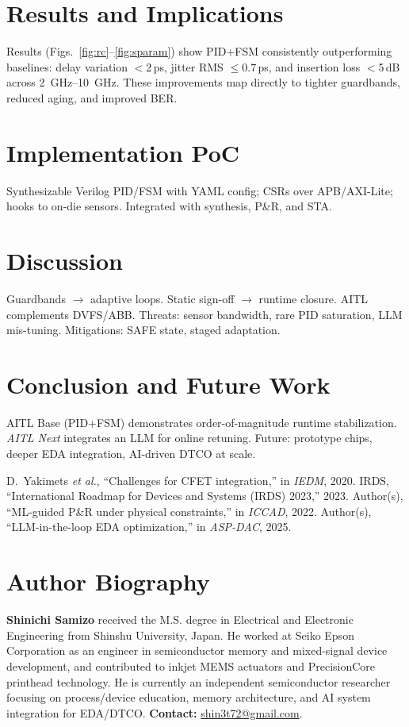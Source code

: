 \documentclass[conference]{IEEEtran}
\newcommand{\etal}{\textit{et al.}}
\begin{document}
\section{Results and Implications}
Results (Figs.~\ref{fig:rc}--\ref{fig:sparam}) show PID+FSM consistently outperforming baselines: delay variation $<$2\,ps, jitter RMS $\leq0.7$\,ps, and insertion loss $<$5\,dB across \SIrange{2}{10}{GHz}. These improvements map directly to tighter guardbands, reduced aging, and improved BER.

\section{Implementation PoC}
Synthesizable Verilog PID/FSM with YAML config; CSRs over APB/AXI-Lite; hooks to on-die sensors. Integrated with synthesis, P\&R, and STA.

\section{Discussion}
Guardbands $\rightarrow$ adaptive loops. Static sign-off $\rightarrow$ runtime closure. AITL complements DVFS/ABB. Threats: sensor bandwidth, rare PID saturation, LLM mis-tuning. Mitigations: SAFE state, staged adaptation.

\section{Conclusion and Future Work}
AITL Base (PID+FSM) demonstrates order-of-magnitude runtime stabilization. \emph{AITL Next} integrates an LLM for online retuning. Future: prototype chips, deeper EDA integration, AI-driven DTCO at scale.

\begin{thebibliography}{99}
 D.~Yakimets \etal, ``Challenges for CFET integration,'' in \emph{IEDM}, 2020.
 IRDS, ``International Roadmap for Devices and Systems (IRDS) 2023,'' 2023.
 Author(s), ``ML-guided P\&R under physical constraints,'' in \emph{ICCAD}, 2022.
 Author(s), ``LLM-in-the-loop EDA optimization,'' in \emph{ASP-DAC}, 2025.
\end{thebibliography}

\section*{Author Biography}
\textbf{Shinichi Samizo} received the M.S. degree in Electrical and Electronic Engineering from Shinshu University, Japan. 
He worked at Seiko Epson Corporation as an engineer in semiconductor memory and mixed-signal device development, 
and contributed to inkjet MEMS actuators and PrecisionCore printhead technology. 
He is currently an independent semiconductor researcher focusing on process/device education, memory architecture, 
and AI system integration for EDA/DTCO. 
\textbf{Contact:} \href{mailto:shin3t72@gmail.com}{shin3t72@gmail.com}.
\end{document}
